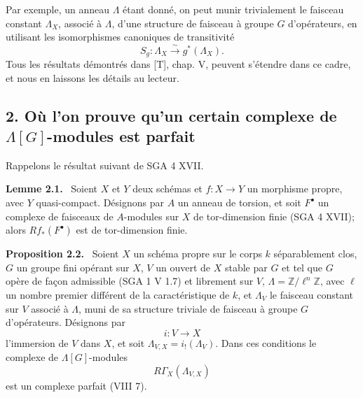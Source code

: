 \documentclass[11pt]{article}
\newenvironment{statement}[1]{\par\medskip\noindent\textbf{#1.}\ }{\par\medskip}
\begin{document}
Par exemple, un anneau $\Lambda$ étant donné, on peut munir trivialement le faisceau constant $\Lambda_X$, associé à $\Lambda$, d'une structure de faisceau à groupe $G$ d'opérateurs, en utilisant les isomorphismes canoniques de transitivité
\[
S_g:\Lambda_X\xrightarrow{\sim}g^*(\Lambda_X).
\]
Tous les résultats démontrés dans [T], chap. V, peuvent s'étendre dans ce cadre, et nous en laissons les détails au lecteur.

\subsection*{2. Où l'on prouve qu'un certain complexe de $\Lambda[G]$-modules est parfait}

Rappelons le résultat suivant de SGA 4 XVII.

\begin{statement}{Lemme 2.1}
Soient $X$ et $Y$ deux schémas et $f:X\to Y$ un morphisme propre, avec $Y$ quasi-compact. Désignons par $A$ un anneau de torsion, et soit $F^\bullet$ un complexe de faisceaux de $A$-modules sur $X$ de tor-dimension finie (SGA 4 XVII); alors $Rf_*(F^\bullet)$ est de tor-dimension finie.
\end{statement}

\begin{statement}{Proposition 2.2}
Soient $X$ un schéma propre sur le corps $k$ séparablement clos, $G$ un groupe fini opérant sur $X$, $V$ un ouvert de $X$ stable par $G$ et tel que $G$ opère de façon admissible (SGA 1 V 1.7) et librement sur $V$, $\Lambda=\mathbb Z/\ell^n\mathbb Z$, avec $\ell$ un nombre premier différent de la caractéristique de $k$, et $\Lambda_V$ le faisceau constant sur $V$ associé à $\Lambda$, muni de sa structure triviale de faisceau à groupe $G$ d'opérateurs. Désignons par
\[
i:V\longrightarrow X
\]
l'immersion de $V$ dans $X$, et soit $\Lambda_{V,X}=i_!(\Lambda_V)$. Dans ces conditions le complexe de $\Lambda[G]$-modules
\[
R\Gamma_X(\Lambda_{V,X})
\]
est un complexe parfait (VIII 7).
\end{statement}
\end{document}
